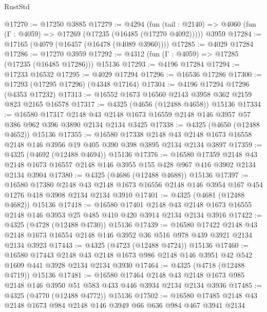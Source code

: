 \begin{lexlean}{RustStd}
\begin{coremodule}
@17270 := @17250 @3885
@17279 := @4294
    (fun (tail : @2140) => @4060 (fun (Γ : @4059) => @17269 (@17235 (@16485 (@17270 @4092)))))
    @3959
@17284 := @17165 (@4079 (@16457 (@16478 (@4089 @3960))))
@17285 := @4029 @17284
@17286 := @17270 @3959
@17292 := @4312 (fun (Γ : @4059) => @17285 (@17235 (@16485 @17286))) @15136
@17293 := @4196 @17284
@17294 := @17233 @16532
@17295 := @4029 @17294
@17296 := @16536 @17286
@17300 := @17293 (@17295 @17296) (@4348 @17164)
@17304 := @4196 @17294 @17296 (@4353 @17232)
@17313 := @16552 @1673 @16560 @2143 @3958 @362 @2159 @823 @2165 @16578
@17317 := @4325 (@4656 (@12488 @4658)) @15136
@17334 := @16580
    @17317
    @2148
    @43
    @2148
    @1673
    @16559
    @2148
    @146
    @3957
    @57
    @386
    @962
    @396
    @3890
    @2134
    @2134
    @3425
@17338 := @4325 (@4650 (@12488 @4652)) @15136
@17355 := @16580
    @17338
    @2148
    @43
    @2148
    @1673
    @16558
    @2148
    @146
    @3956
    @19
    @405
    @390
    @398
    @3895
    @2134
    @2134
    @3897
@17359 := @4325 (@4692 (@12488 @4694)) @15136
@17376 := @16580
    @17359
    @2148
    @43
    @2148
    @1673
    @16557
    @2148
    @146
    @3955
    @155
    @428
    @967
    @416
    @3902
    @2134
    @2134
    @3904
@17380 := @4325 (@4686 (@12488 @4688)) @15136
@17397 := @16580
    @17380
    @2148
    @43
    @2148
    @1673
    @16556
    @2148
    @146
    @3954
    @167
    @454
    @1276
    @418
    @3908
    @2134
    @2134
    @3910
@17401 := @4325 (@4681 (@12488 @4682)) @15136
@17418 := @16580
    @17401
    @2148
    @43
    @2148
    @1673
    @16555
    @2148
    @146
    @3953
    @25
    @485
    @410
    @420
    @3914
    @2134
    @2134
    @3916
@17422 := @4325 (@4728 (@12488 @4730)) @15136
@17439 := @16580
    @17422
    @2148
    @43
    @2148
    @1673
    @16554
    @2148
    @146
    @3952
    @36
    @516
    @978
    @439
    @3921
    @2134
    @2134
    @3923
@17443 := @4325 (@4723 (@12488 @4724)) @15136
@17460 := @16580
    @17443
    @2148
    @43
    @2148
    @1673
    @986
    @2148
    @146
    @3951
    @42
    @542
    @1609
    @441
    @3928
    @2134
    @2134
    @3930
@17464 := @4325 (@4718 (@12488 @4719)) @15136
@17481 := @16580
    @17464
    @2148
    @43
    @2148
    @1673
    @985
    @2148
    @146
    @3950
    @51
    @583
    @433
    @446
    @3934
    @2134
    @2134
    @3936
@17485 := @4325 (@4770 (@12488 @4772)) @15136
@17502 := @16580
    @17485
    @2148
    @43
    @2148
    @1673
    @984
    @2148
    @146
    @3949
    @66
    @636
    @984
    @467
    @3941
    @2134

\end{coremodule}
\end{lexlean}
